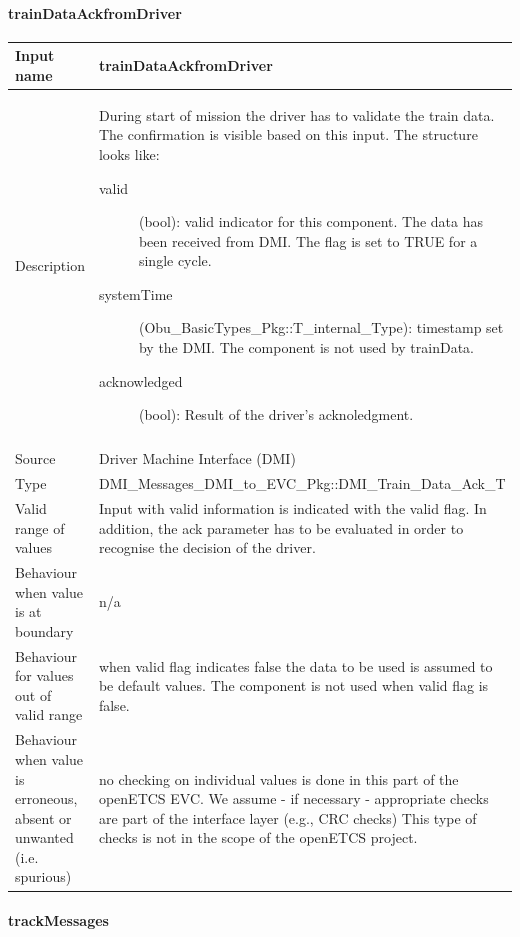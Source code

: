 \paragraph{trainDataAckfromDriver}

\begin{longtable}{p{}p{}}
\toprule
Input name				& trainDataAckfromDriver \\
\midrule
Description				& During start of mission the driver has to validate the train data. The confirmation is visible  based on this input. The structure looks like:
\begin{description}
\item[valid](bool): valid indicator for this component. The data has been received from DMI. The flag is set to TRUE for a single cycle. 
\item[systemTime](Obu\_BasicTypes\_Pkg::T\_internal\_Type): timestamp set by the DMI. The component is not used by trainData.
\item[acknowledged](bool): Result of the driver's acknoledgment.
\end{description} \\
\\
\midrule
Source					& Driver Machine Interface (DMI) \\ 
\midrule
Type					& DMI\_Messages\_DMI\_to\_EVC\_Pkg::DMI\_Train\_Data\_Ack\_T \\
\midrule
Valid range of values	& Input with valid information is indicated with the valid flag. In addition, the ack parameter has to be evaluated in order to recognise the decision of the driver.\\
\midrule
Behaviour when value is at boundary	& n/a\\
\midrule
Behaviour for values out of valid range	& when valid flag indicates false the data to be used is assumed to be default values. The component is not used when valid flag is false.\\
\midrule
Behaviour when value is erroneous, absent or unwanted (i.e. spurious) & no checking on individual values is done in this part of the openETCS EVC. We assume - if necessary - appropriate checks are part of the interface layer (e.g., CRC checks) This type of checks is not in the scope of the openETCS project.\\

\bottomrule
\end{longtable}
\paragraph{trackMessages}

